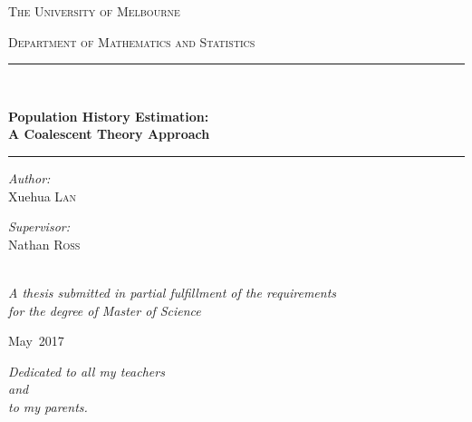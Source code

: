 \documentclass[12pt, a4paper,twoside]{report}
\theoremstyle{definition}
\theoremstyle{myplain}
\theoremstyle{mypro}
\begin{document}
\begin{titlepage}
\begin{center}
\vspace*{.03\textheight}
{\scshape\LARGE The University of Melbourne\par}\vspace{0.6cm}
\textsc{\Large Department of Mathematics and Statistics}\\[0.9cm]
\rule{0.95\textwidth}{1.2 pt}\vspace{0.3cm}\\
{\huge \textbf{Population History Estimation:\\ A Coalescent Theory Approach}\par}\vspace{0.3cm} %
\rule{0.95\textwidth}{1.2 pt}
\vfill
\vspace{0.6cm}

\begin{minipage}[t]{0.4\textwidth}
\begin{flushleft} \large
\emph{Author:}\\
{Xuehua \textsc{Lan}}
\end{flushleft}
\end{minipage}
\begin{minipage}[t]{0.4\textwidth}
\begin{flushright} \large
\emph{Supervisor:} \\
{Nathan \textsc{Ross}}
\end{flushright}
\end{minipage}\\[3cm]

\vfill
\vspace*{.24\textheight}
\large \textit{A thesis submitted in partial fulfillment of the requirements\\ for the degree of Master of Science}\\[0.6cm] 
\vfill
\vspace*{.12\textheight}

{\large May~2017}\\[4cm]
\end{center}
\end{titlepage}

\thispagestyle{empty}
\vspace*{.36\textheight}
\begin{center}
\textit{Dedicated to all my teachers\\ and \\to my parents.}
\end{center}
\clearpage
\end{document}

